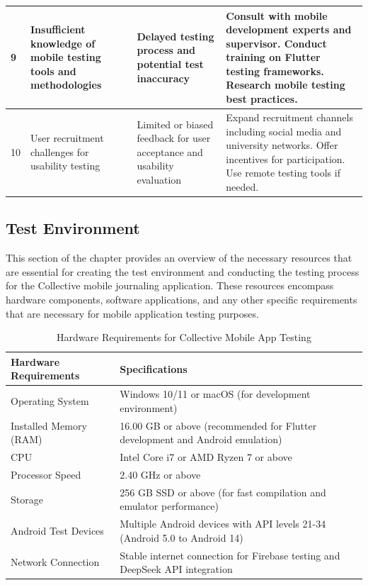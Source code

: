 \begin{table}[H]
\begin{tabular}{|p{1cm}|p{4cm}|p{3cm}|p{6cm}|}
\hline
9 & Insufficient knowledge of mobile testing tools and methodologies & Delayed testing process and potential test inaccuracy & Consult with mobile development experts and supervisor. Conduct training on Flutter testing frameworks. Research mobile testing best practices. \\
\hline
10 & User recruitment challenges for usability testing & Limited or biased feedback for user acceptance and usability evaluation & Expand recruitment channels including social media and university networks. Offer incentives for participation. Use remote testing tools if needed. \\
\hline
\end{tabular}
\end{table}

\subsection{Test Environment}\label{sec:testEnvironment}

This section of the chapter provides an overview of the necessary resources that are essential for creating the test environment and conducting the testing process for the Collective mobile journaling application. These resources encompass hardware components, software applications, and any other specific requirements that are necessary for mobile application testing purposes.

\begin{table}[H]
\centering
\caption{Hardware Requirements for Collective Mobile App Testing}
\label{tab:hardware-test-requirements}
\begin{tabular}{|p{6cm}|p{8cm}|}
\hline
\textbf{Hardware Requirements} & \textbf{Specifications} \\
\hline
Operating System & Windows 10/11 or macOS (for development environment) \\
\hline
Installed Memory (RAM) & 16.00 GB or above (recommended for Flutter development and Android emulation) \\
\hline
CPU & Intel Core i7 or AMD Ryzen 7 or above \\
\hline
Processor Speed & 2.40 GHz or above \\
\hline
Storage & 256 GB SSD or above (for fast compilation and emulator performance) \\
\hline
Android Test Devices & Multiple Android devices with API levels 21-34 (Android 5.0 to Android 14) \\
\hline
Network Connection & Stable internet connection for Firebase testing and DeepSeek API integration \\
\hline
\end{tabular}
\end{table}

